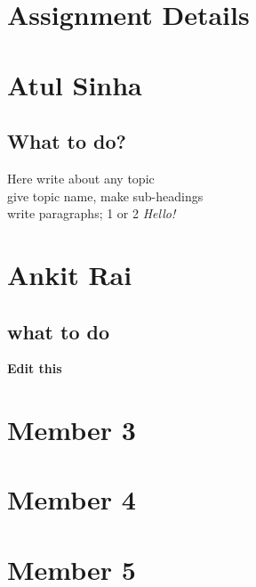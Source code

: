 \documentclass[a4paper,12pt]{article}
\begin{document}
\newpage
\section*{Assignment Details}
\lipsum[1-2] %


\newpage
\tableofcontents


\newpage
\section{Atul Sinha}
\subsection{What to do?}
\Large Here write about any topic\\ give topic name, make sub-headings\\ write paragraphs; 1 or 2 
\vspace{0.3in}
\newline
\textit{\normalsize Hello!}



\newpage
\section{Ankit Rai}
\subsection{what to do}
\vspace{0.2in}
\hspace{1in}
\textbf{Edit this}


\newpage
\section{Member 3}


\newpage
\section{Member 4}


\newpage
\section{Member 5}
\end{document}
